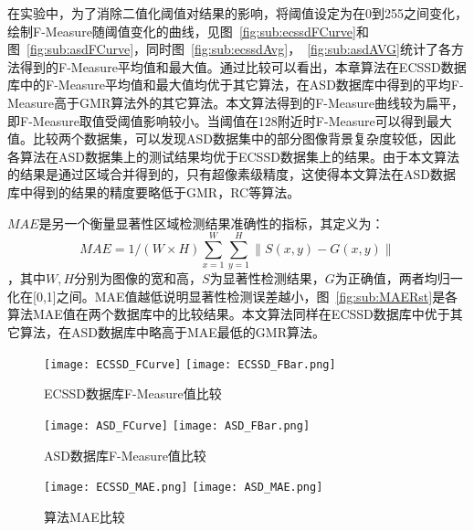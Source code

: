 在实验中，为了消除二值化阈值对结果的影响，将阈值设定为在0到255之间变化，绘制F-Measure随阈值变化的曲线，见图~\ref{fig:sub:ecssdFCurve}和图~\ref{fig:sub:asdFCurve}，同时图~\ref{fig:sub:ecssdAvg}，~\ref{fig:sub:asdAVG}统计了各方法得到的F-Measure平均值和最大值。通过比较可以看出，本章算法在ECSSD数据库中的F-Measure平均值和最大值均优于其它算法，在ASD数据库中得到的平均F-Measure高于GMR算法外的其它算法。本文算法得到的F-Measure曲线较为扁平，即F-Measure取值受阈值影响较小。当阈值在128附近时F-Measure可以得到最大值。比较两个数据集，可以发现ASD数据集中的部分图像背景复杂度较低，因此各算法在ASD数据集上的测试结果均优于ECSSD数据集上的结果。由于本文算法的结果是通过区域合并得到的，只有超像素级精度，这使得本文算法在ASD数据库中得到的结果的精度要略低于GMR，RC等算法。 \par
$MAE$是另一个衡量显著性区域检测结果准确性的指标，其定义为：
$$MAE=1/(W\times H) \sum_{x=1}^W\sum_{y=1}^H \| S(x,y)-G(x,y)\|$$ ，其中$W,H$分别为图像的宽和高，$S$为显著性检测结果，$G$为正确值，两者均归一化在[0,1]之间。MAE值越低说明显著性检测误差越小，图~\ref{fig:sub:MAERst}是各算法MAE值在两个数据库中的比较结果。本文算法同样在ECSSD数据库中优于其它算法，在ASD数据库中略高于MAE最低的GMR算法。\par
\begin{figure}[h]
  \centering%
    {\texttt{[image: ECSSD\_FCurve]}}%
      {\texttt{[image: ECSSD\_FBar.png]}}
  \caption{ECSSD数据库F-Measure值比较}
  \label{fig:ECSSDRst}
\end{figure}

\begin{figure}[h]
  \centering%
    {\texttt{[image: ASD\_FCurve]}}%
      {\texttt{[image: ASD\_FBar.png]}}
  \caption{ASD数据库F-Measure值比较}
  \label{fig:ASDRst}
\end{figure}

\begin{figure}[h]
  \centering%
    {\texttt{[image: ECSSD\_MAE.png]}}%
      {\texttt{[image: ASD\_MAE.png]}}
  \caption{算法MAE比较}
  \label{fig:MAERst}
\end{figure}

